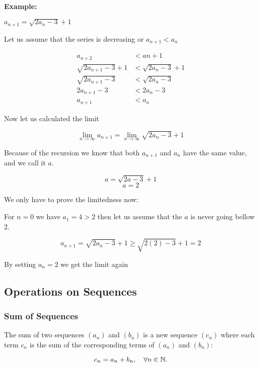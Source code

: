 \textbf{Example: } 
\vspace{\baselineskip}

\(a_{n + 1} = \sqrt{2a_n - 3} + 1\)
\vspace{\baselineskip}

Let us assume that the series is decreasing or \(a_{n + 1} < a_{n}\)

\begin{align*}
    a_{n + 2} &< a{n + 1} \\
    \sqrt{2a_{n + 1} -3} + 1 &< \sqrt{2a_{n} - 3} + 1 \\
    \sqrt{2a_{n + 1} -3} &< \sqrt{2a_{n} - 3} \\
    2a_{n + 1} - 3 &< 2a_{n} - 3 \\
    a_{n + 1} &< a_{n}
\end{align*}

\QED

Now let us calculated the limit

\[
    \lim_{n \rightarrow \infty} a_{n + 1} = \lim_{n \rightarrow \infty} \sqrt{2a_n - 3} + 1
\]

Because of the recursion we know that both \(a_{n + 1}\) and \(a_n\) have the same value, 
and we call it \(a\).

\[
    a = \sqrt{2a -3} +1
\]
\[
    a = 2
\]

We only have to prove the limitedness now:

For \(n = 0\) we have \(a_1 = 4 > 2\) then let us assume that the \(a\) is never going bellow 2.

\[
    a_{n + 1} = \sqrt{2a_n - 3} + 1 \ge \sqrt{2(2) - 3} + 1 = 2
\]

By setting \(a_n = 2\) we get the limit again

\QED

\subsection{Operations on Sequences}

\subsubsection{Sum of Sequences}

The sum of two sequences \((a_n)\) and \((b_n)\) is a new sequence \((c_n)\) where each term 
\(c_n\) is the sum of the corresponding terms of \((a_n)\) and \((b_n)\):

\[
    c_n = a_n + b_n, \quad \forall n \in \mathbb{N}.
\]

